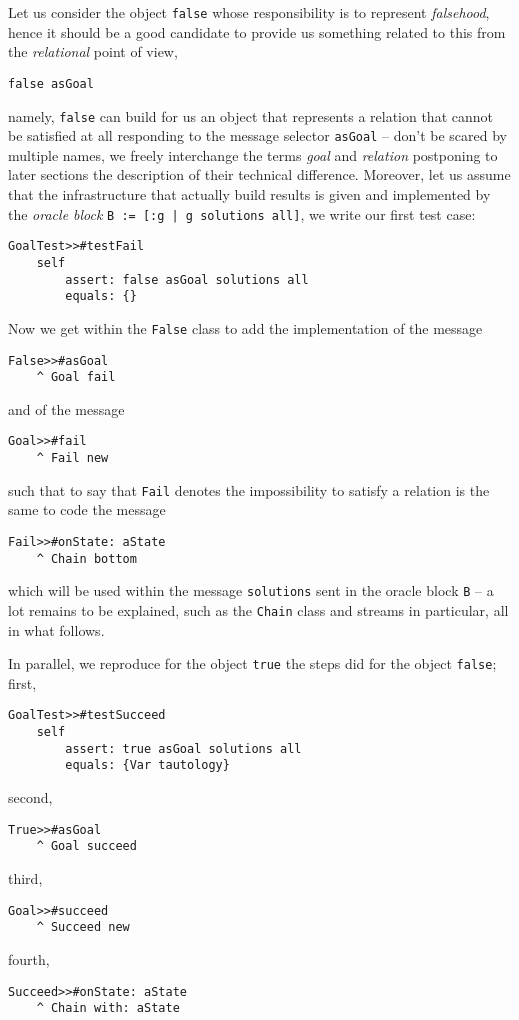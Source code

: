 \documentclass[a4paper,12pt]{article}
\begin{document}
Let us consider the object \Verb|false| whose responsibility is to represent
\textit{falsehood}, hence it should be a good candidate to provide us something
related to this from the \textit{relational} point of view,
\begin{verbatim}
false asGoal
\end{verbatim}
namely, \Verb|false| can build for us an object that represents a relation that
cannot be satisfied at all responding to the message selector \Verb|asGoal| --
don't be scared by multiple names, we freely interchange the terms
\textit{goal} and \textit{relation} postponing to later sections the
description of their technical difference. Moreover, let us 
assume that the infrastructure that actually build results is given and implemented
by the \textit{oracle block} \texttt{B := [:g | g solutions all]}, we write our first test case:
\begin{verbatim}
GoalTest>>#testFail
    self 
        assert: false asGoal solutions all 
        equals: {}
\end{verbatim}
Now we get within the \Verb|False| class to add the implementation of the message
\begin{verbatim}
False>>#asGoal
    ^ Goal fail
\end{verbatim}
and of the message
\begin{verbatim}
Goal>>#fail
    ^ Fail new
\end{verbatim}
such that to say that \verb|Fail| denotes the impossibility to satisfy a relation
is the same to code the message
\begin{verbatim}
Fail>>#onState: aState 
    ^ Chain bottom
\end{verbatim}
which will be used within the message \Verb|solutions| sent in the oracle block
\Verb|B| -- a lot remains to be explained, such as the \Verb|Chain| class and
streams in particular, all in what follows.

In parallel, we reproduce for the object \Verb|true| the steps did for
the object \Verb|false|; first,
\begin{verbatim}
GoalTest>>#testSucceed
    self 
        assert: true asGoal solutions all 
        equals: {Var tautology}
\end{verbatim}
second,
\begin{verbatim}
True>>#asGoal
    ^ Goal succeed
\end{verbatim}
third,
\begin{verbatim}
Goal>>#succeed
    ^ Succeed new
\end{verbatim}
fourth,
\begin{verbatim}
Succeed>>#onState: aState 
    ^ Chain with: aState
\end{verbatim}
\end{document}
